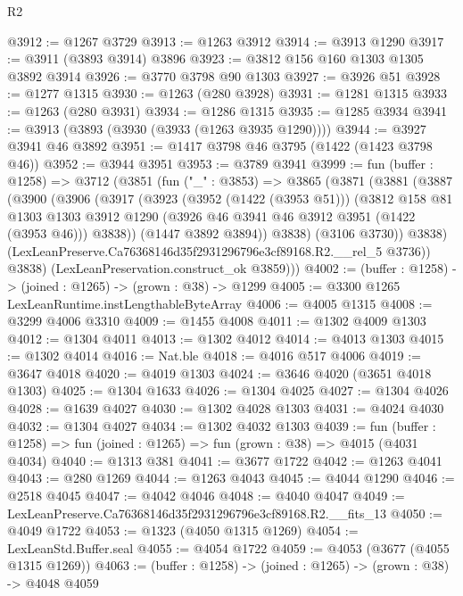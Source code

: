 \begin{lexlean}{R2}
\begin{coremodule}
@3912 := @1267 @3729
@3913 := @1263 @3912
@3914 := @3913 @1290
@3917 := @3911 (@3893 @3914) @3896
@3923 := @3812 @156 @160 @1303 @1305 @3892 @3914
@3926 := @3770 @3798 @90 @1303
@3927 := @3926 @51
@3928 := @1277 @1315
@3930 := @1263 (@280 @3928)
@3931 := @1281 @1315
@3933 := @1263 (@280 @3931)
@3934 := @1286 @1315
@3935 := @1285 @3934
@3941 := @3913 (@3893 (@3930 (@3933 (@1263 @3935 @1290))))
@3944 := @3927 @3941 @46 @3892
@3951 := @1417 @3798 @46 @3795 (@1422 (@1423 @3798 @46))
@3952 := @3944 @3951
@3953 := @3789 @3941
@3999 := fun (buffer : @1258) =>
  @3712
    (@3851
      (fun ("_" : @3853) =>
      @3865
        (@3871
          (@3881
            (@3887
              (@3900
                (@3906
                  (@3917
                    (@3923
                      (@3952 (@1422 (@3953 @51)))
                      (@3812
                        @158
                        @81
                        @1303
                        @1303
                        @3912
                        @1290
                        (@3926 @46 @3941 @46 @3912 @3951 (@1422 (@3953 @46)))
                        @3838))
                    (@1447 @3892 @3894))
                  @3838)
                (@3106 @3730))
              @3838)
            (LexLeanPreserve.Ca76368146d35f2931296796e3cf89168.R2.__rel_5 @3736))
          @3838)
        (LexLeanPreservation.construct_ok @3859)))
@4002 := (buffer : @1258) -> (joined : @1265) -> (grown : @38) -> @1299
@4005 := @3300 @1265 LexLeanRuntime.instLengthableByteArray
@4006 := @4005 @1315
@4008 := @3299 @4006 @3310
@4009 := @1455 @4008
@4011 := @1302 @4009 @1303
@4012 := @1304 @4011
@4013 := @1302 @4012
@4014 := @4013 @1303
@4015 := @1302 @4014
@4016 := Nat.ble
@4018 := @4016 @517 @4006
@4019 := @3647 @4018
@4020 := @4019 @1303
@4024 := @3646 @4020 (@3651 @4018 @1303)
@4025 := @1304 @1633
@4026 := @1304 @4025
@4027 := @1304 @4026
@4028 := @1639 @4027
@4030 := @1302 @4028 @1303
@4031 := @4024 @4030
@4032 := @1304 @4027
@4034 := @1302 @4032 @1303
@4039 := fun (buffer : @1258) => fun (joined : @1265) => fun (grown : @38) => @4015 (@4031 @4034)
@4040 := @1313 @381
@4041 := @3677 @1722
@4042 := @1263 @4041
@4043 := @280 @1269
@4044 := @1263 @4043
@4045 := @4044 @1290
@4046 := @2518 @4045
@4047 := @4042 @4046
@4048 := @4040 @4047
@4049 := LexLeanPreserve.Ca76368146d35f2931296796e3cf89168.R2.__fits_13
@4050 := @4049 @1722
@4053 := @1323 (@4050 @1315 @1269)
@4054 := LexLeanStd.Buffer.seal
@4055 := @4054 @1722
@4059 := @4053 (@3677 (@4055 @1315 @1269))
@4063 := (buffer : @1258) -> (joined : @1265) -> (grown : @38) -> @4048 @4059

\end{coremodule}
\end{lexlean}
